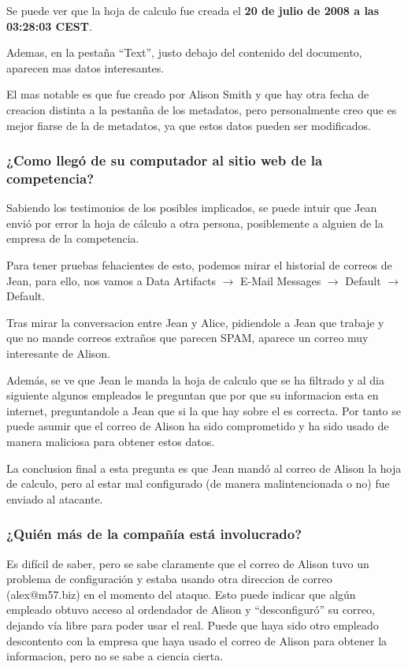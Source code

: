 \documentclass{article}
\begin{document}
Se puede ver que la hoja de calculo fue creada el \textbf{20 de julio de 2008 a las 03:28:03 CEST}.

Ademas, en la pestaña ``Text'', justo debajo del contenido del documento, aparecen mas datos interesantes.


El mas notable es que fue creado por Alison Smith y que hay otra fecha de creacion distinta a la pestanña de los metadatos, pero personalmente creo que es mejor fiarse de la de metadatos, ya que estos datos pueden ser modificados.

\subsubsection*{¿Como llegó de su computador al sitio web de la competencia?}

Sabiendo los testimonios de los posibles implicados, se puede intuir que Jean envió por error la hoja de cálculo a otra persona, posiblemente a alguien de la empresa de la competencia.

Para tener pruebas fehacientes de esto, podemos mirar el historial de correos de Jean, para ello, nos vamos a Data Artifacts $\rightarrow$ E-Mail Messages $\rightarrow$ Default $\rightarrow$ Default.


Tras mirar la conversacion entre Jean y Alice, pidiendole a Jean que trabaje y que no mande correos extraños que parecen SPAM, aparece un correo muy interesante de Alison.


Además, se ve que Jean le manda la hoja de calculo que se ha filtrado y al dia siguiente algunos empleados le preguntan que por que su informacion esta en internet, preguntandole a Jean que si la que hay sobre el es correcta. Por tanto se puede asumir que el correo de Alison ha sido comprometido y ha sido usado de manera maliciosa para obtener estos datos.

La conclusion final a esta pregunta es que Jean mandó al correo de Alison la hoja de calculo, pero al estar mal configurado (de manera malintencionada o no) fue enviado al atacante.


\subsubsection*{¿Quién más de la compañía está involucrado?}

Es difícil de saber, pero se sabe claramente que el correo de Alison tuvo un problema de configuración y estaba usando otra direccion de correo (alex@m57.biz) en el momento del ataque. Esto puede indicar que algún empleado obtuvo acceso al ordendador de Alison y ``desconfiguró'' su correo, dejando vía libre para poder usar el real. Puede que haya sido otro empleado descontento con la empresa que haya usado el correo de Alison para obtener la informacion, pero no se sabe a ciencia cierta.
\end{document}
